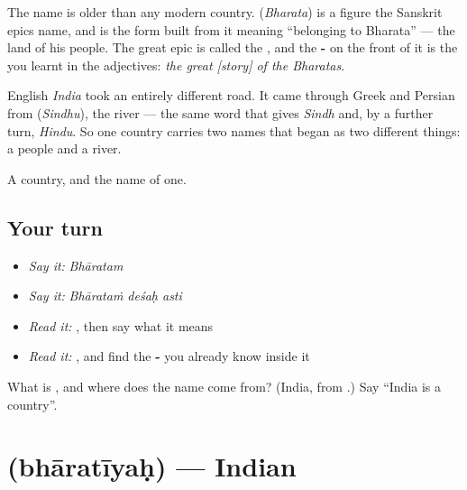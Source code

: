 The name is older than any modern country. \textbf{} (\emph{Bharata}) is a figure the Sanskrit epics name, and \textbf{} is the form built from it meaning \textquotedblleft{}belonging to Bharata\textquotedblright{} — the land of his people. The great epic is called the \textbf{}, and the \textbf{-} on the front of it is the \textbf{} you learnt in the adjectives: \emph{the great {[}story{]} of the Bharatas}.

English \emph{India} took an entirely different road. It came through Greek and Persian from \textbf{} (\emph{Sindhu}), the river — the same word that gives \emph{Sindh} and, by a further turn, \emph{Hindu}. So one country carries two names that began as two different things: a people and a river.

\begin{grammarlens}[title={What you've built}]
A country, and the name of one.
\end{grammarlens}

\subsection*{Your turn}
\begin{itemize}
\raggedright
  \item \emph{Say it:} \emph{Bhāratam}
  \item \emph{Say it:} \emph{Bhārataṁ deśaḥ asti}
  \item \emph{Read it:} \textbf{}, then say what it means
  \item \emph{Read it:} \textbf{}, and find the \textbf{-} you already know inside it
\end{itemize}

\begin{tcolorbox}[breakable,colback=teal!4,colframe=teal!35!black,title={Before you move on}]
What is \textbf{}, and where does the name come from? (India, from \textbf{}.) Say \textquotedblleft{}India is a country\textquotedblright{}.
\end{tcolorbox}
\section[\texorpdfstring{\sk{भारतीयः} (bhāratīyaḥ)}{भारतीयः (bhāratīyaḥ)}]{ (bhāratīyaḥ) — Indian}

\label{lesson:SA-C59-bharatiyah}



